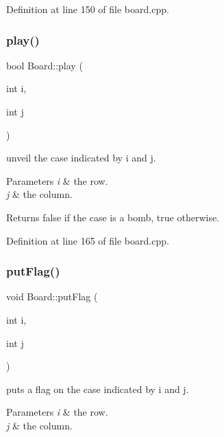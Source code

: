 Definition at line 150 of file board.\+cpp.

\mbox{\label{class_board_a47700b8c7c08c2843e200594e620f2fa}} 
\subsubsection{\texorpdfstring{play()}{play()}}
{\footnotesize\ttfamily bool Board\+::play (\begin{DoxyParamCaption}\item[{int}]{i,  }\item[{int}]{j }\end{DoxyParamCaption})}



unveil the case indicated by i and j. 


\begin{DoxyParams}{Parameters}
{\em i} & the row. \\
\hline
{\em j} & the column. \\
\hline
\end{DoxyParams}
\begin{DoxyReturn}{Returns}
false if the case is a bomb, true otherwise. 
\end{DoxyReturn}


Definition at line 165 of file board.\+cpp.

\mbox{\label{class_board_a1d4e828a0cc3b85ba3f86534e76e2f84}} 
\subsubsection{\texorpdfstring{put\+Flag()}{putFlag()}}
{\footnotesize\ttfamily void Board\+::put\+Flag (\begin{DoxyParamCaption}\item[{int}]{i,  }\item[{int}]{j }\end{DoxyParamCaption})}



puts a flag on the case indicated by i and j. 


\begin{DoxyParams}{Parameters}
{\em i} & the row. \\
\hline
{\em j} & the column. \\
\hline
\end{DoxyParams}


